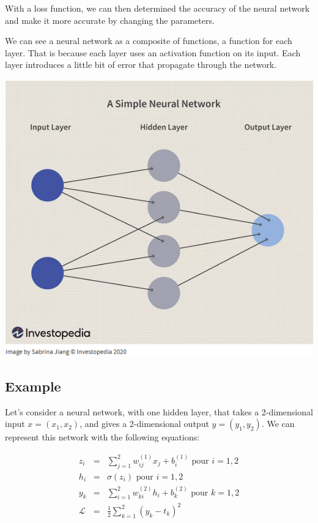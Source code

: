 \documentclass[10pt,a4paper]{article}
\theoremstyle{definition}
\theoremstyle{theorem}
\begin{document}
With a loss function, we can then determined the accuracy of the neural network and make it more accurate by changing the parameters. 

We can see a neural network as a composite of functions, a function for each layer. That is because each layer uses an activation function on its input. Each layer introduces a little bit of error that propagate through the network.

\begin{center}
\includegraphics[scale=0.55]{nn.png}
\end{center}  

\subsection{Example} \label{2.1}

Let's consider a neural network, with one hidden layer, that takes a 2-dimensional input $x = (x_1, x_2)$, and gives a 2-dimensional output $y = (y_1,y_2)$. We can represent this network with the following equations:

   \begin{eqnarray}
   \nonumber
   z_i & = & \sum_{j=1}^2 w_{ij}^{(1)}x_j + b_i^{(1)} \text{ pour } i = 1,2 \\ 
   \nonumber
   h_i & = & \sigma (z_i) \text{ pour } i=1,2 \\
   \nonumber
   y_k & = & \sum_{i=1}^2 w_{ki}^{(2)}h_i + b_k^{(2)} \text{ pour } k = 1,2 \\
   \nonumber
   \mathcal{L} & = & \frac{1}{2} \sum_{k = 1}^2 (y_k - t_k)^2
   \end{eqnarray}
   
\end{document}
